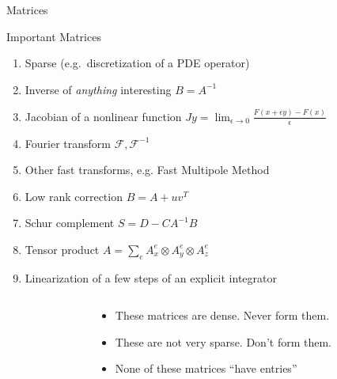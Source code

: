 \begin{frame}{Matrices}
\begin{block}{Important Matrices}
  \begin{enumerate}
  \item Sparse (e.g.~discretization of a PDE operator)
  \item \alert<2,4>{Inverse of \emph{anything} interesting $B = A^{-1}$}
  \item \alert<4>{Jacobian of a nonlinear function $J y = \lim_{\epsilon \to 0} \frac{F(x + \epsilon y) - F(x)}{\epsilon}$}
  \item \alert<2,4>{Fourier transform $\mathcal{F},\mathcal{F}^{-1}$}
  \item \alert<2,4>{Other fast transforms, e.g. Fast Multipole Method}
  \item \alert<2,4>{Low rank correction $B = A + u v^T$}
  \item \alert<2,4>{Schur complement $S = D - C A^{-1} B$}
  \item \alert<3,4>{Tensor product $A = \sum_e A_x^e \otimes A_y^e \otimes A_z^e$}
  \item \alert<3,4>{Linearization of a few steps of an explicit integrator}
  \end{enumerate}
  \begin{columns}\begin{column}{0.2\textwidth}\end{column}\begin{column}{0.8\textwidth}
  \begin{itemize}
  \item<only@2> These matrices are \alert<2>{dense}.  Never form them.
  \item<only@3>{These are \alert<3>{not very sparse}.}
    Don't form them.
  \item<only@4> {None of these matrices ``have entries''}
  \end{itemize}
\end{column}
\end{columns}
\end{block}
\end{frame}
